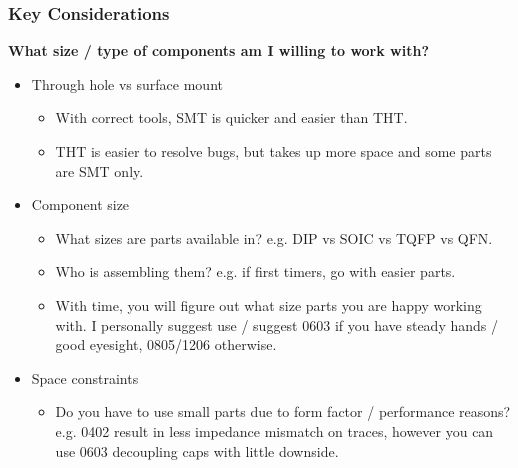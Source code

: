 \documentclass[t]{beamer}
\begin{document}

\begin{frame}
\frametitle{Key Considerations}
\large{\textbf{What size / type of components am I willing to work with?}}
\vspace{1mm}
\begin{itemize}
	\item Through hole vs surface mount
	\begin{itemize}
		\item With correct tools, SMT is quicker and easier than THT. 
		\item THT is easier to resolve bugs, but takes up more space and some parts are SMT only. 
	\end{itemize} 
	\item Component size
	\begin{itemize}
		\item What sizes are parts available in? e.g. DIP vs SOIC vs TQFP vs QFN.
		\item Who is assembling them? e.g. if first timers, go with easier parts. 
		\item With time, you will figure out what size parts you are happy working with. I personally suggest use / suggest 0603 if you have steady hands / good eyesight, 0805/1206 otherwise. 
	\end{itemize}
	\item Space constraints
	\begin{itemize}
		\item Do you have to use small parts due to form factor / performance reasons? e.g. 0402 result in less impedance mismatch on traces, however you can use 0603 decoupling caps with little downside.   
	\end{itemize}
\end{itemize}
\end{frame}

\end{document}
